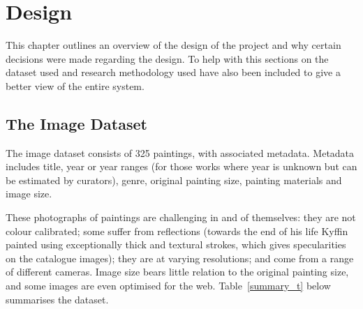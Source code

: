 \chapter{Design}

This chapter outlines an overview of the design of the project and why certain decisions were made
regarding the design. To help with this sections on the dataset used and research methodology used
have also been included to give a better view of the entire system.






\section{The Image Dataset}
The image dataset consists of 325 paintings, with associated metadata. Metadata
includes title, year or year ranges (for those works where year is unknown but
can be estimated by curators), genre, original painting size, painting
materials and image size.

These photographs of paintings are challenging in and of themselves: they are
not colour calibrated; some suffer from reflections (towards the end of his
life Kyffin painted using exceptionally thick and textural strokes, which gives
specularities on the catalogue images); they are at varying resolutions; and
come from a range of different cameras. Image size bears little relation to the
original painting size, and some images are even optimised for the web.
Table~\ref{summary_t} below summarises the dataset.

